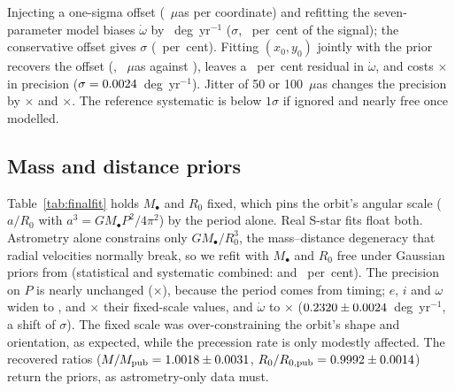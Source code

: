 \documentclass{aastex701}
\begin{document}
Injecting a one-sigma offset (~$\mu$as per coordinate) and refitting the seven-parameter model biases $\dot\omega$ by ~deg~yr$^{-1}$ ($\sigma$, ~per~cent of the signal); the conservative offset gives $\sigma$ (~per~cent). Fitting $(x_0,y_0)$ jointly with the prior recovers the offset (, ~$\mu$as against ), leaves a ~per~cent residual in $\dot\omega$, and costs $\times$ in precision ($\sigma = 0.0024{}$~deg~yr$^{-1}$). Jitter of 50 or 100~$\mu$as changes the precision by $\times$ and $\times$. The reference systematic is below $1\sigma$ if ignored and nearly free once modelled.

\subsection{Mass and distance priors}
\label{sec:massdist}

Table~\ref{tab:finalfit} holds $M_\bullet$ and $R_0$ fixed, which pins the orbit's angular scale ($a/R_0$ with $a^3 = GM_\bullet P^2/4\pi^2$) by the period alone. Real S-star fits float both. Astrometry alone constrains only $GM_\bullet/R_0^3$, the mass--distance degeneracy that radial velocities normally break, so we refit with $M_\bullet$ and $R_0$ free under Gaussian priors from \citet{gravity2022massdist} (statistical and systematic combined: \massdistSigmaMPct{} and \massdistSigmaRZeroPct{}~per~cent). The precision on $P$ is nearly unchanged (\massdistRatioCapPYr{}$\times$), because the period comes from timing; $e$, $i$ and $\omega$ widen to \massdistRatioE{}, \massdistRatioIDeg{} and \massdistRatioOmegaDeg{}$\times$ their fixed-scale values, and $\dot\omega$ to \massdistRatioOmegaDotDegYr{}$\times$ ($0.2320 \pm 0.0024$~deg~yr$^{-1}$, a shift of \massdistOmegaDotShiftNsigma{}$\sigma$). The fixed scale was over-constraining the orbit's shape and orientation, as expected, while the precession rate is only modestly affected. The recovered ratios ($M/M_{\rm pub} = 1.0018 \pm 0.0031$, $R_0/R_{0,{\rm pub}} = 0.9992 \pm 0.0014$) return the priors, as astrometry-only data must.
\end{document}
